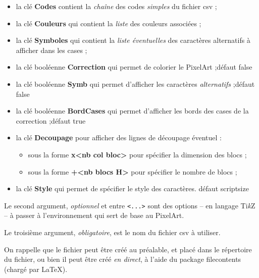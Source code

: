 \documentclass{article}
\newcommand\Cle[1]{{\bfseries\sffamily\textlangle #1\textrangle}}
\begin{document}
\begin{itemize}
	\item la clé \Cle{Codes} contient la \textit{chaîne} des codes \textit{simples} du  fichier \textsf{csv} ;
	\item la clé \Cle{Couleurs} qui contient la \textit{liste} des couleurs associées ;
	\item la clé \Cle{Symboles} qui contient la \textit{liste éventuelles} des caractères alternatifs à afficher dans les cases ;
	\item la clé booléenne \Cle{Correction} qui permet de colorier le PixelArt ;\hfill{}défaut \textsf{false}
	\item la clé booléenne \Cle{Symb} qui permet d'afficher les caractères \textit{alternatifs} ;\hfill{}défaut \textsf{false}
	\item la clé booléenne \Cle{BordCases} qui permet d'afficher les bords des cases de la correction ;\hfill{}défaut \textsf{true}
	\item la clé \Cle{Decoupage} pour afficher des lignes de découpage éventuel :
	\begin{itemize}
		\item sous la forme \Cle{<nb lig bloc>x<nb col bloc>} pour spécifier la dimension des blocs ;
		\item sous la forme \Cle{<nb blocs V>+<nb blocs H>} pour spécifier le nombre de blocs ;
	\end{itemize}
	\item la clé \Cle{Style} qui permet de spécifier le style des caractères. \hfill{}défaut \textsf{scriptsize}
\end{itemize}

Le second argument, \textit{optionnel} et entre \texttt{<...>} sont des options -- en langage Ti\textit{k}Z -- à passer à l'environnement qui sert de base au PixelArt.

\medskip

Le troisième argument, \textit{obligatoire}, est le nom du fichier \textsf{csv} à utiliser.

\vspace{1cm}

On rappelle que le fichier peut être créé au préalable, et placé dans le répertoire du fichier, ou bien il peut être créé \textit{en direct}, à l'aide du package \textsf{filecontents} (chargé par \LaTeX).
\end{document}
